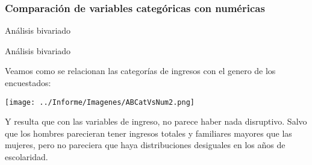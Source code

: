 \documentclass[pdf]{beamer}
\begin{document}
    \subsubsection{Comparación de variables categóricas con numéricas}

\begin{frame}{Análisis bivariado}


\end{frame}

 
 
\begin{frame}{Análisis bivariado}
    \footnotesize

    Veamos como se relacionan las categorías de ingresos con el genero de los encuestados:
    \begin{center}
        \texttt{[image: ../Informe/Imagenes/ABCatVsNum2.png]}
    \end{center}
    Y resulta que con las variables de ingreso, no parece haber nada disruptivo. Salvo que los hombres parecieran tener ingresos totales y familiares mayores que las mujeres, pero no pareciera que haya distribuciones desiguales en los años de escolaridad.

\end{frame}

 
 
 
 
\end{document}
